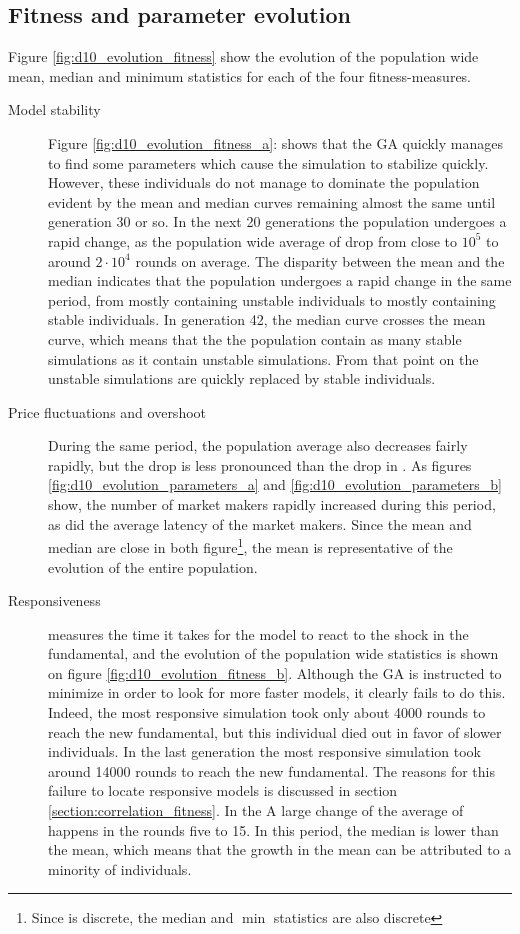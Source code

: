 \subsection{Fitness and parameter evolution}\label{section:fitness_and_paraeter_evolution}
Figure \ref{fig:d10_evolution_fitness} show the evolution of the population wide mean, median and minimum statistics for each of the four fitness-measures. 
\begin{description}
\item[Model stability]
Figure \ref{fig:d10_evolution_fitness_a}: shows that  the GA quickly manages to find some parameters which cause the simulation to stabilize quickly. However, these individuals do not manage to dominate the population evident by the mean and median curves remaining almost the same until generation 30 or so. In the next 20 generations the population undergoes a rapid change, as the population wide average of \roundstable drop from close to $10^5$ to around $2\cdot 10^4$ rounds on average. The disparity between the mean and the median indicates that the population undergoes a rapid change in the same period, from mostly containing unstable individuals to mostly containing stable individuals. In generation 42, the median curve crosses the mean curve, which means that the the population contain as many stable simulations as it contain unstable simulations. From that point on the unstable simulations are quickly replaced by stable individuals.
\item[Price fluctuations and overshoot] During the same period, the population average \stdev also decreases fairly rapidly, but the drop is less pronounced than the drop in \stdev. As figures \ref{fig:d10_evolution_parameters_a} and \ref{fig:d10_evolution_parameters_b} show, the number of market makers rapidly increased during this period, as did the average latency of the market makers. Since the mean and median are close in both figure\footnote{Since \overshoot is discrete, the median and $\min$ statistics are also discrete}, the mean is representative of the evolution of the entire population.
\item[Responsiveness] \timetoreachnewfundamental measures the time it takes for the model to react to the shock in the fundamental, and the evolution of the population wide statistics is shown on figure \ref{fig:d10_evolution_fitness_b}. Although the GA is instructed to minimize \timetoreachnewfundamental in order to look for more faster models, it clearly fails to do this. Indeed, the most responsive simulation took only about 4000 rounds to reach the new fundamental, but this individual died out in favor of slower individuals. In the last generation the most responsive simulation took around 14000 rounds to reach the new fundamental. The reasons for this failure to locate responsive models is discussed in section \ref{section:correlation_fitness}. In the A large change of the average of \timetoreachnewfundamental happens in the rounds five to 15. In this period, the median is lower than the mean, which means that the growth in the mean can be attributed to a minority of individuals.
\end{description}


